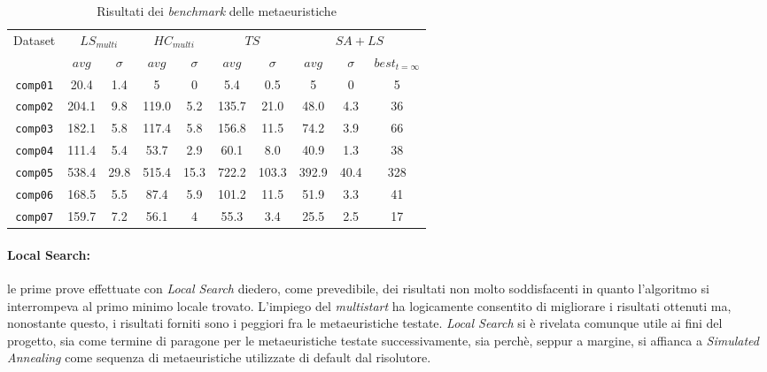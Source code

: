 \documentclass[]{article}
\begin{document}
\begin{table}
	\caption{\label{tab:results} Risultati dei \textit{benchmark} delle metaeuristiche}
	\scriptsize
\begin{center}
	\begin{tabular}{| c | c c | c c  | c c |  c c | c |}
		\hline
		\multirow{2}{*}{Dataset} & 
		\multicolumn{2}{|c|}{$LS_{multi}$} & \multicolumn{2}{c|}{$HC_{multi}$} & \multicolumn{2}{c|}{$TS$}  & \multicolumn{3}{c|}{$SA+LS$} \\
		\cline{2-10}
		& $avg$ & $\sigma$ & $avg$ & $\sigma$ & 
		$avg$ & $\sigma$ & $avg$ & $\sigma$ & $best_{t=\infty}$ \\
		\hline  
		\texttt{comp01} & 20.4 & 1.4 		&  5 & 0 					& 5.4 & 0.5		 		& 5 & 0 & 5\\
		\texttt{comp02} & 204.1 & 9.8 		&  119.0 & 5.2		&  135.7 & 21.0 		& 48.0 & 4.3 & 36\\
		\texttt{comp03} &182.1 & 5.8 		&  117.4 & 5.8 			& 156.8 & 11.5 		& 74.2 & 3.9 & 66 \\
		\texttt{comp04} &111.4 & 5.4 		&  53.7 & 2.9 			& 60.1 & 8.0 			& 40.9 & 1.3 & 38\\
		\texttt{comp05} &538.4 & 29.8 		&  515.4 & 15.3		& 722.2 & 103.3 	& 392.9 & 40.4 & 328\\
		\texttt{comp06} &168.5 & 5.5 		&  87.4 & 5.9 			& 101.2 & 11.5 		& 51.9 & 3.3 & 41\\
		\texttt{comp07} &159.7 & 7.2 		&  56.1 & 4 			& 55.3 & 3.4 		& 25.5 & 2.5 & 17\\
		\hline
	\end{tabular}
\end{center}
\end{table}

\paragraph{Local Search:} le prime prove effettuate con \textit{Local Search} diedero, come prevedibile, dei risultati non molto soddisfacenti in quanto l'algoritmo si interrompeva al primo minimo locale trovato. L'impiego del \textit{multistart} ha logicamente consentito di migliorare i risultati ottenuti ma, nonostante questo, i risultati forniti sono i peggiori fra le metaeuristiche testate.  \textit{Local Search} si è rivelata comunque utile ai fini del progetto, sia come termine di paragone per le metaeuristiche testate successivamente, sia perchè, seppur a margine,  si affianca a \textit{Simulated Annealing} come sequenza di metaeuristiche utilizzate di default dal risolutore.
\end{document}
